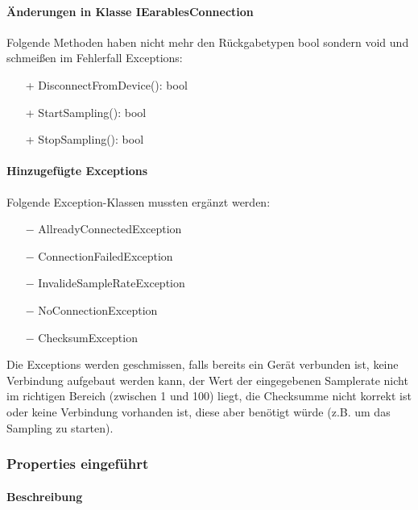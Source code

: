 \documentclass[a4paper,12pt]{article}
\begin{document}
\paragraph{Änderungen in Klasse IEarablesConnection}
Folgende Methoden haben nicht mehr den Rückgabetypen bool sondern void und schmeißen im Fehlerfall Exceptions:
\begin{itemize}
	\item[+] DisconnectFromDevice(): bool
	\item[+] StartSampling(): bool
	\item[+] StopSampling(): bool
\end{itemize} 
\paragraph{Hinzugefügte Exceptions}
Folgende Exception-Klassen mussten ergänzt werden:
\begin{itemize}
	\item[$-$] AllreadyConnectedException
	\item[$-$] ConnectionFailedException
	\item[$-$] InvalideSampleRateException
	\item[$-$] NoConnectionException
	\item[$-$] ChecksumException %
\end{itemize}
Die Exceptions werden geschmissen, falls bereits ein Gerät verbunden ist, keine Verbindung aufgebaut werden kann, der Wert der eingegebenen Samplerate nicht im richtigen Bereich (zwischen 1 und 100) liegt, die Checksumme nicht korrekt ist oder keine Verbindung vorhanden ist, diese aber benötigt würde (z.B. um das Sampling zu starten).

\subsubsection{Properties eingeführt}
\paragraph{Beschreibung}
\end{document}
